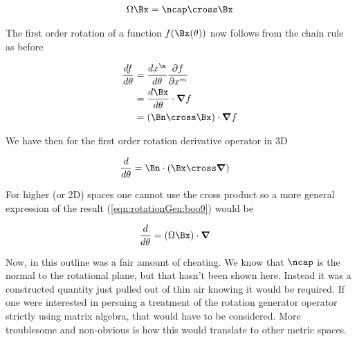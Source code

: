 \begin{align}\label{eqn:rotationGen:boo8}
\Omega \Bx = \ncap \cross \Bx
\end{align}

The first order rotation of a function $f(\Bx(\theta))$ now follows from the chain rule as before

\begin{align*}
\frac{df}{d\theta} 
&= 
\frac{d x^\m}{d\theta} 
\frac{\partial f}{\partial x^m} 
\\
&= 
\frac{d \Bx}{d\theta} \cdot \spacegrad f
\\
&= 
(\Bn \cross \Bx) \cdot \spacegrad f
\\
\end{align*}

We have then for the first order rotation derivative operator in 3D

\begin{align}\label{eqn:rotationGen:boo9}
\frac{d}{d\theta} &= \Bn \cdot (\Bx \cross \spacegrad) 
\end{align}

For higher (or 2D) spaces one cannot use the cross product so a more general expression of the result (\ref{eqn:rotationGen:boo9}) would be

\begin{align}\label{eqn:rotationGen:boo10}
\frac{d}{d\theta} &= (\Omega \Bx) \cdot \spacegrad
\end{align}

Now, in this outline was a fair amount of cheating.  We know that $\ncap$ is the normal to the rotational plane, but that hasn't been shown here.  Instead it was a constructed quantity just pulled out of thin air knowing it would be required.  If one were interested in persuing a treatment of the rotation generator operator strictly using matrix algebra, that would have to be considered.  More troublesome and non-obvious is how this would translate to other metric spaces.

\EndArticle
